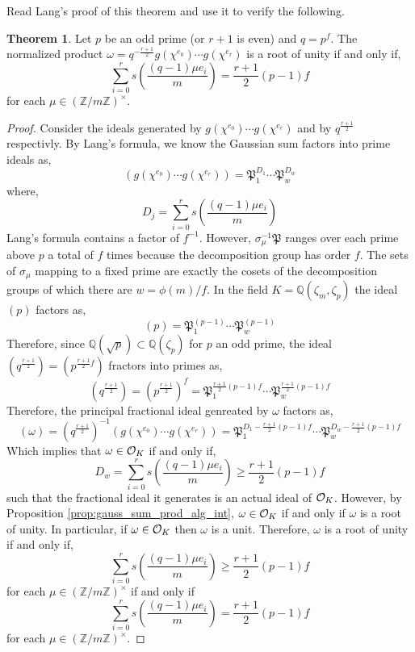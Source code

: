 \documentclass[12pt]{article}
\newcommand{\Z}{\mathbb{Z}}
\newcommand{\Q}{\mathbb{Q}}
\theoremstyle{remark}
\theoremstyle{definition}
\newtheorem{theorem}{Theorem}[subsection]
\begin{document}
Read Lang's proof of this theorem and use it to verify the following.

\newcommand{\s}[1]{s\left( #1 \right)}
\newcommand{\Pf}{\mathfrak{P}}

\begin{theorem} \label{thm:gauss_sum_is_root_of_unity_ideal_factorization_counting_condition}
Let $p$ be an odd prime (or $r + 1$ is even) and $q = p^f$. The normalized product $\omega = q^{-\frac{r+1}{2}} g(\chi^{e_0}) \cdots g(\chi^{e_r})$ is a root of unity if and only if,
\[ \sum_{i = 0}^r s\left(\frac{(q-1) \mu e_i}{m}\right) = \frac{r+1}{2} (p - 1) f \]
for each $\mu \in (\Z / m \Z)^\times$.
\end{theorem}

\begin{proof}
Consider the ideals generated by $g(\chi^{e_0}) \cdots g(\chi^{e_r})$ and by $q^{\frac{r+1}{2}}$ respectivly. By Lang's formula, we know the Gaussian sum factors into prime ideals as,
\[ (g(\chi^{e_0}) \cdots g(\chi^{e_r})) = \mathfrak{P}_1^{D_1} \cdots \mathfrak{P}_{w}^{D_{w}} \]
where,
\[ D_j = \sum_{i = 0}^r s\left(\frac{(q-1) \mu e_i}{m}\right) \]
Lang's formula contains a factor of $f^{-1}$. However, $\sigma_\mu^{-1} \mathfrak{P}$ ranges over each prime above $p$ a total of $f$ times because the decomposition group has order $f$. The sets of $\sigma_\mu$ mapping to a fixed prime are exactly the cosets of the decomposition groups of which there are $w = \phi(m)/f$. In the field $K = \Q(\zeta_m, \zeta_p)$ the ideal $(p)$ factors as,
\[ (p) = \mathfrak{P}_1^{(p-1)} \cdots \mathfrak{P}_w^{(p-1)} \] Therefore, since $\Q(\sqrt{p}) \subset \Q(\zeta_p)$ for $p$ an odd prime, the ideal $(q^{\frac{r+1}{2}}) = (p^{\frac{r+1}{2} f})$ fractors into primes as,
\[ (q^\frac{r+1}{2}) = (p^\frac{r+1}{2})^f = \mathfrak{P}_1^{\frac{r+1}{2} (p-1) f} \cdots \mathfrak{P}_w^{\frac{r+1}{2} (p-1) f} \]
Therefore, the principal fractional ideal genreated by $\omega$ factors as,
\[ (\omega) = (q^{\frac{r+1}{2}})^{-1} (g(\chi^{e_0}) \cdots g(\chi^{e_r})) = \mathfrak{P}_1^{D_1 - \frac{r+1}{2} (p-1) f} \cdots \mathfrak{P}_{w}^{D_{w} - \frac{r+1}{2} (p-1) f } \] 
Which implies that $\omega \in \mathcal{O}_K$ if and only if,
\[ D_w =\sum_{i = 0}^r s\left(\frac{(q-1) \mu e_i}{m}\right) \ge \frac{r+1}{2} (p - 1) f \]
such that the fractional ideal it generates is an actual ideal of $\mathcal{O}_{K}$. However, by Proposition \ref{prop:gauss_sum_prod_alg_int}, $\omega \in \mathcal{O}_K$ if and only if $\omega$ is a root of unity. In particular, if $\omega \in \mathcal{O}_K$ then $\omega$ is a unit. Therefore, $\omega$ is a root of unity if and only if,
\[ \sum_{i = 0}^r s\left(\frac{(q-1) \mu e_i}{m}\right) \ge \frac{r+1}{2} (p - 1) f \]
for each $\mu \in (\Z / m \Z)^\times$
if and only if
\[ \sum_{i = 0}^r s\left(\frac{(q-1) \mu e_i}{m}\right) = \frac{r+1}{2} (p - 1) f \]
for each $\mu \in (\Z / m \Z)^\times$. 
\end{proof}
\end{document}
